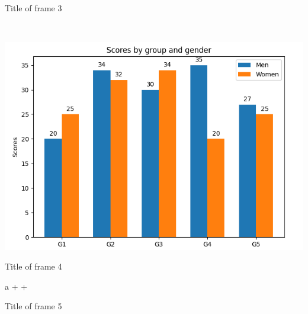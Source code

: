 \documentclass{beamer}
\begin{document}
\begin{frame}{Title of frame 3}
\begin{gridlayout}{\textwidth}{0.67\textwidth}
\begin{row}{0.373}
\begin{cell}{0.079}
          ~
        \end{cell}
        \begin{cell}{0.473}
          \centering
          \includegraphics[height = \rowheight]{img/matplotlib-graph.png}
        \end{cell}
      \end{row}
    \end{gridlayout}
\end{frame}



\begin{frame}{Title of frame 4}
  \begin{imaths}
    a + \int {} + 
  \end{imaths}
\end{frame}



\begin{frame}{Title of frame 5}

\end{frame}

\end{document}
